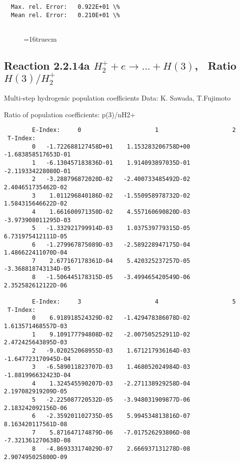 \documentclass[12pt,dvipdfmx]{article}
\begin{document}
{\begin{small}
\begin{verbatim}
  Max. rel. Error:   0.922E+01 \%
  Mean rel. Error:   0.210E+01 \%


\end{verbatim}\end{small}
\begin{figure} \label{2.2.5ly}
\epsfxsize=16truecm
\end{figure}

\newpage
\subsection{
Reaction 2.2.14a $ H_2^+ + e \rightarrow ...+ H(3) $, \  Ratio $H(3)/H_2^+ $
}

 Multi-step hydrogenic population coefficients
 Data: K. Sawada, T.Fujimoto \cite{kn:Sawada}

 Ratio of population coefficients: p(3)/nH2+


\begin{small}\begin{verbatim}
        E-Index:     0                     1                     2
 T-Index:
        0   -1.722688127458D+01    1.153283206758D+00   -1.683858517653D-01
        1   -6.130457183836D-01    1.914093897035D-01   -2.119334228080D-01
        2   -3.288796872020D-02   -2.400733485492D-02    2.404651735462D-02
        3    1.011296840186D-02   -1.550958978732D-02    1.584315646622D-02
        4    1.661600971350D-02    4.557160690820D-03   -3.973908011295D-03
        5   -1.332921799914D-03    1.037539779315D-05    6.731975412111D-05
        6   -1.279967875089D-03   -2.589228947175D-04    1.486622411070D-04
        7    2.677167178361D-04    5.420325237257D-05   -3.368818743134D-05
        8   -1.506445178315D-05   -3.499465420549D-06    2.352582612122D-06

        E-Index:     3                     4                     5
 T-Index:
        0    6.918918524329D-02   -1.429478386078D-02    1.613571468557D-03
        1    9.109177794808D-02   -2.007505252911D-02    2.472425643895D-03
        2   -9.020252068955D-03    1.671217936164D-03   -1.647723170945D-04
        3   -6.589011823707D-03    1.468052024984D-03   -1.881996632423D-04
        4    1.324545590207D-03   -2.271138929258D-04    2.197082919209D-05
        5   -2.225087720532D-05   -3.948031909877D-06    2.183242092156D-06
        6   -2.359201102735D-05    5.994534813816D-07    8.163420117561D-08
        7    5.871647174879D-06   -7.017526293806D-08   -7.321361270638D-08
        8   -4.869333174029D-07    2.666937131278D-08    2.907495025800D-09


\end{verbatim}
\end{small}}
\end{document}
